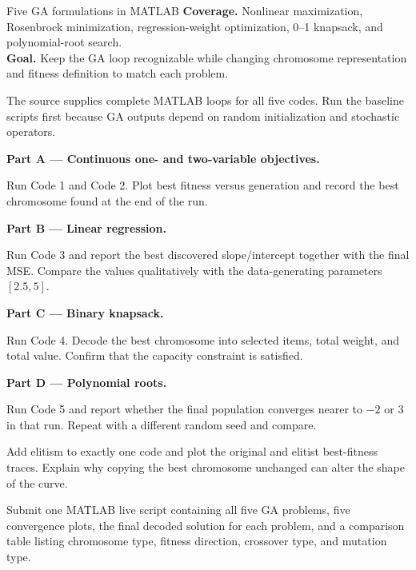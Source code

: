 
\begin{labproject}{Five GA formulations in MATLAB}
\textbf{Coverage.} Nonlinear maximization, Rosenbrock minimization, regression-weight optimization, 0--1 knapsack, and polynomial-root search.\\
\textbf{Goal.} Keep the GA loop recognizable while changing chromosome representation and fitness definition to match each problem.

\begin{labmode}
The source supplies complete MATLAB loops for all five codes. Run the baseline scripts first because GA outputs depend on random initialization and stochastic operators.
\end{labmode}

\medskip\noindent\textbf{Part A --- Continuous one- and two-variable objectives.}\par
Run Code 1 and Code 2. Plot best fitness versus generation and record the best chromosome found at the end of the run.

\medskip\noindent\textbf{Part B --- Linear regression.}\par
Run Code 3 and report the best discovered slope/intercept together with the final MSE. Compare the values qualitatively with the data-generating parameters \([2.5,5]\).

\medskip\noindent\textbf{Part C --- Binary knapsack.}\par
Run Code 4. Decode the best chromosome into selected items, total weight, and total value. Confirm that the capacity constraint is satisfied.

\medskip\noindent\textbf{Part D --- Polynomial roots.}\par
Run Code 5 and report whether the final population converges nearer to \(-2\) or 3 in that run. Repeat with a different random seed and compare.

\begin{tryit}
Add elitism to exactly one code and plot the original and elitist best-fitness traces. Explain why copying the best chromosome unchanged can alter the shape of the curve.
\end{tryit}
\end{labproject}

\begin{labdeliverable}
Submit one MATLAB live script containing all five GA problems, five convergence plots, the final decoded solution for each problem, and a comparison table listing chromosome type, fitness direction, crossover type, and mutation type.
\end{labdeliverable}
